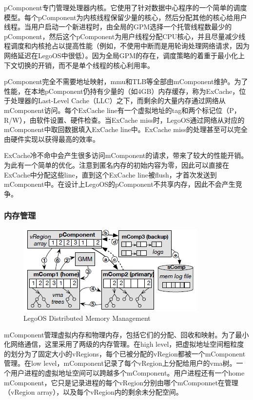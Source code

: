pComponent专门管理处理器内核。它使用了针对数据中心程序的一个简单的调度模型。每个pComponent为内核线程保留少量的核心，然后分配其他的核心给用户线程。当用户启动一个新进程时，由全局的GPM选择一个托管线程数最少的pComponent，然后这个pComponent为用户线程分配CPU核心，并且尽量减少线程调度和内核抢占以提高性能（例如，不使用中断而是用轮询处理网络请求，因为网络延迟在LegoOS中很低）。因为全局GPM的存在，调度策略的着重于最小化上下文切换的开销，而不是单个线程的核心利用率。

pComponent完全不需要地址映射，mmu和TLB等全部由mComponent维护。为了性能，在本地pComponent仍持有少量的（如4GB）内存缓存，称为ExCache，位于处理器的Last-Level Cache（LLC）之下，而剩余的大量内存通过网络从mComponent访问。每个ExCache line有一个虚拟地址的tag和两个标记位（P，R/W），由软件设置、硬件检查。当ExCache miss时，LegoOS通过网络从对应的mComponent中取回数据填入ExCache line中。ExCache miss的处理甚至可以完全由硬件实现以获得最高的效率。

ExCache冷不命中会产生很多访问mComponent的请求，带来了较大的性能开销。为此有一个简单的优化。注意到匿名内存的初始内容为零，因此可以直接在ExCache中分配这些line，直到这个ExCache line被flush，才首次发送到mComponent中。在设计上LegoOS的pComponent不共享内存，因此不会产生竞争。

\subsubsection{内存管理}

\begin{figure}[h]
\centering
\includegraphics[scale=1.00]{Figures/legoos/memory_management.png}
\decoRule
\caption{LegoOS Distributed Memory Management}
\label{fig:legoos_memory_management}
\end{figure}

mComponent管理虚拟内存和物理内存，包括它们的分配、回收和映射。为了最小化网络通信，这里采用了两级的内存管理。在high level，把虚拟地址空间粗粒度的划分为了固定大小的vRegions，每个已被分配的vRegion都被一个mComponent管理。在low level，mComponent记录了每个vRegion上分配给用户的vma树。一个用户进程的虚拟地址空间可以跨越多个mComponent。用户进程还有一个home mComponent，它只是记录进程的每个vRegion分别由哪个mComponnet在管理（vRegion array），以及每个vRegion内的剩余未分配空间。


